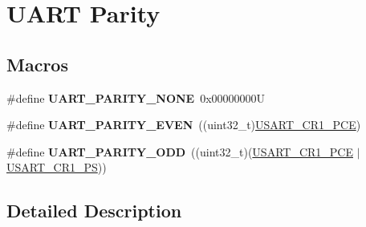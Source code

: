 \hypertarget{group___u_a_r_t___parity}{}\section{U\+A\+RT Parity}
\label{group___u_a_r_t___parity}
\subsection*{Macros}
\begin{DoxyCompactItemize}
\item 
\mbox{\label{group___u_a_r_t___parity_ga270dea6e1a92dd83fe58802450bdd60c}} 
\#define {\bfseries U\+A\+R\+T\+\_\+\+P\+A\+R\+I\+T\+Y\+\_\+\+N\+O\+NE}~0x00000000U
\item 
\mbox{\label{group___u_a_r_t___parity_ga063b14ac42ef9e8f4246c17a586b14eb}} 
\#define {\bfseries U\+A\+R\+T\+\_\+\+P\+A\+R\+I\+T\+Y\+\_\+\+E\+V\+EN}~((uint32\+\_\+t)\mbox{\hyperlink{group___peripheral___registers___bits___definition_ga60f8fcf084f9a8514efafb617c70b074}{U\+S\+A\+R\+T\+\_\+\+C\+R1\+\_\+\+P\+CE}})
\item 
\mbox{\label{group___u_a_r_t___parity_ga229615e64964f68f7a856ea6ffea359e}} 
\#define {\bfseries U\+A\+R\+T\+\_\+\+P\+A\+R\+I\+T\+Y\+\_\+\+O\+DD}~((uint32\+\_\+t)(\mbox{\hyperlink{group___peripheral___registers___bits___definition_ga60f8fcf084f9a8514efafb617c70b074}{U\+S\+A\+R\+T\+\_\+\+C\+R1\+\_\+\+P\+CE}} $\vert$ \mbox{\hyperlink{group___peripheral___registers___bits___definition_ga2e159d36ab2c93a2c1942df60e9eebbe}{U\+S\+A\+R\+T\+\_\+\+C\+R1\+\_\+\+PS}}))
\end{DoxyCompactItemize}


\subsection{Detailed Description}
